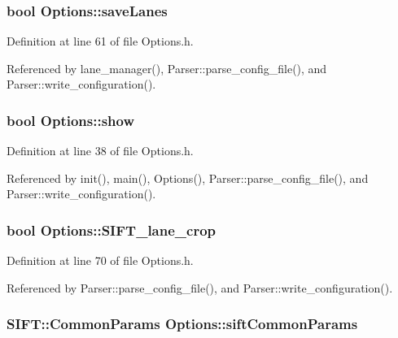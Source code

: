 \hypertarget{class_options_abbb026b8b9eb99f147913912e6a8b1b9}{
\subsubsection[{save\-Lanes}]{\setlength{\rightskip}{0pt plus 5cm}bool {\bf \-Options\-::save\-Lanes}}}
\label{class_options_abbb026b8b9eb99f147913912e6a8b1b9}


\-Definition at line 61 of file \-Options.\-h.



\-Referenced by lane\-\_\-manager(), \-Parser\-::parse\-\_\-config\-\_\-file(), and \-Parser\-::write\-\_\-configuration().

\hypertarget{class_options_a0daf1af70609b4d1d1ef633c459dcdbb}{
\subsubsection[{show}]{\setlength{\rightskip}{0pt plus 5cm}bool {\bf \-Options\-::show}}}
\label{class_options_a0daf1af70609b4d1d1ef633c459dcdbb}


\-Definition at line 38 of file \-Options.\-h.



\-Referenced by init(), main(), \-Options(), \-Parser\-::parse\-\_\-config\-\_\-file(), and \-Parser\-::write\-\_\-configuration().

\hypertarget{class_options_a6c6a59d771c1212823ab5f8ff3852bc8}{
\subsubsection[{\-S\-I\-F\-T\-\_\-lane\-\_\-crop}]{\setlength{\rightskip}{0pt plus 5cm}bool {\bf \-Options\-::\-S\-I\-F\-T\-\_\-lane\-\_\-crop}}}
\label{class_options_a6c6a59d771c1212823ab5f8ff3852bc8}


\-Definition at line 70 of file \-Options.\-h.



\-Referenced by \-Parser\-::parse\-\_\-config\-\_\-file(), and \-Parser\-::write\-\_\-configuration().

\hypertarget{class_options_a63c080ac129b8c92ba3cdc9ca07250de}{
\subsubsection[{sift\-Common\-Params}]{\setlength{\rightskip}{0pt plus 5cm}\-S\-I\-F\-T\-::\-Common\-Params {\bf \-Options\-::sift\-Common\-Params}}}
\label{class_options_a63c080ac129b8c92ba3cdc9ca07250de}


